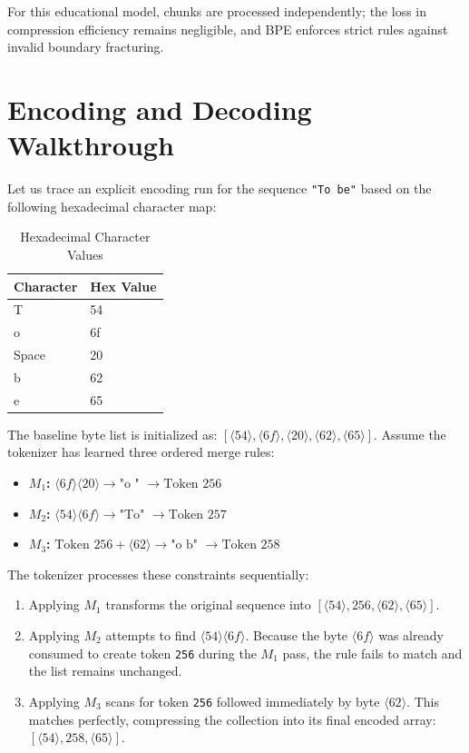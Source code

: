 \documentclass{article}
\begin{document}
For this educational model, chunks are processed independently; the loss in compression efficiency remains negligible, and BPE enforces strict rules against invalid boundary fracturing.

\section{Encoding and Decoding Walkthrough}
Let us trace an explicit encoding run for the sequence \texttt{"To be"} based on the following hexadecimal character map:

\begin{table}[h]
\centering
\caption{Hexadecimal Character Values}
\label{tab:hex_values}
\begin{tabular}{ll}
\toprule
\textbf{Character} & \textbf{Hex Value} \\
\midrule
T & 54 \\
o & 6f \\
Space & 20 \\
b & 62 \\
e & 65 \\
\bottomrule
\end{tabular}
\end{table}

The baseline byte list is initialized as: $[\langle 54 \rangle, \langle 6f \rangle, \langle 20 \rangle, \langle 62 \rangle, \langle 65 \rangle]$. Assume the tokenizer has learned three ordered merge rules:
\begin{itemize}
    \item \textbf{$M_1$:} $\langle 6f \rangle\langle 20 \rangle \rightarrow \text{"o " } \rightarrow \text{Token } 256$
    \item \textbf{$M_2$:} $\langle 54 \rangle\langle 6f \rangle \rightarrow \text{"To" } \rightarrow \text{Token } 257$
    \item \textbf{$M_3$:} $\text{Token } 256 + \langle 62 \rangle \rightarrow \text{"o b" } \rightarrow \text{Token } 258$
\end{itemize}

The tokenizer processes these constraints sequentially:
\begin{enumerate}
    \item Applying $M_1$ transforms the original sequence into $[\langle 54 \rangle, 256, \langle 62 \rangle, \langle 65 \rangle]$.
    \item Applying $M_2$ attempts to find $\langle 54 \rangle\langle 6f \rangle$. Because the byte $\langle 6f \rangle$ was already consumed to create token \texttt{256} during the $M_1$ pass, the rule fails to match and the list remains unchanged.
    \item Applying $M_3$ scans for token \texttt{256} followed immediately by byte $\langle 62 \rangle$. This matches perfectly, compressing the collection into its final encoded array: $[\langle 54 \rangle, 258, \langle 65 \rangle]$.
\end{enumerate}
\end{document}
